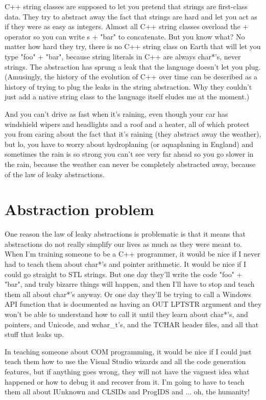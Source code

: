\documentclass{article}
\begin{document}
\begin{compactitem}
\item C++ string classes are supposed to let you pretend that strings are first-class data. They try to abstract away the fact that strings are hard and let you act as if they were as easy as integers. Almost all C++ string classes overload the + operator so you can write s + "bar" to concatenate. But you know what? No matter how hard they try, there is no C++ string class on Earth that will let you type "foo" + "bar", because string literals in C++ are always char*'s, never strings. The abstraction has sprung a leak that the language doesn't let you plug. (Amusingly, the history of the evolution of C++ over time can be described as a history of trying to plug the leaks in the string abstraction. Why they couldn't just add a native string class to the language itself eludes me at the moment.)
\item And you can't drive as fast when it's raining, even though your car has windshield wipers and headlights and a roof and a heater, all of which protect you from caring about the fact that it's raining (they abstract away the weather), but lo, you have to worry about hydroplaning (or aquaplaning in England) and sometimes the rain is so strong you can't see very far ahead so you go slower in the rain, because the weather can never be completely abstracted away, because of the law of leaky abstractions.
\end{compactitem}

\section{Abstraction problem}

One reason the law of leaky abstractions is problematic is that it means that abstractions do not really simplify our lives as much as they were meant to. When I'm training someone to be a C++ programmer, it would be nice if I never had to teach them about char*'s and pointer arithmetic. It would be nice if I could go straight to STL strings. But one day they'll write the code "foo" + "bar", and truly bizarre things will happen, and then I'll have to stop and teach them all about char*'s anyway. Or one day they'll be trying to call a Windows API function that is documented as having an OUT LPTSTR argument and they won't be able to understand how to call it until they learn about char*'s, and pointers, and Unicode, and wchar\_t's, and the TCHAR header files, and all that stuff that leaks up.

In teaching someone about COM programming, it would be nice if I could just teach them how to use the Visual Studio wizards and all the code generation features, but if anything goes wrong, they will not have the vaguest idea what happened or how to debug it and recover from it. I'm going to have to teach them all about IUnknown and CLSIDs and ProgIDS and ... oh, the humanity!
\end{document}
